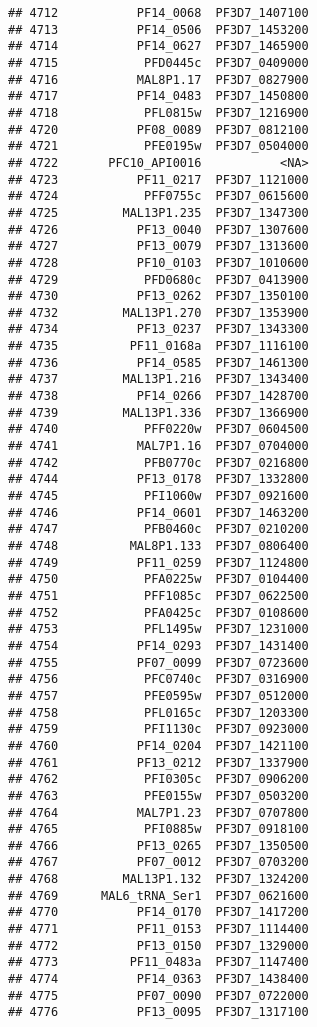 \documentclass{article}\usepackage[]{graphicx}\usepackage[]{color}
\makeatletter
\newenvironment{kframe}{%
 \def\at@end@of@kframe{}%
 \ifinner\ifhmode%
  \def\at@end@of@kframe{\end{minipage}}%
  \begin{minipage}{\columnwidth}%
 \fi\fi%
 \def\FrameCommand##1{\hskip\@totalleftmargin \hskip-\fboxsep
 \colorbox{shadecolor}{##1}\hskip-\fboxsep
     \hskip-\linewidth \hskip-\@totalleftmargin \hskip\columnwidth}%
 \MakeFramed {\advance\hsize-\width
   \@totalleftmargin\z@ \linewidth\hsize
   \@setminipage}}%
 {\par\unskip\endMakeFramed%
 \at@end@of@kframe}
\newenvironment{knitrout}{}{} %
\makeatother
\begin{document}
\begin{knitrout}
\begin{kframe}
\begin{verbatim}
## 4712           PF14_0068  PF3D7_1407100
## 4713           PF14_0506  PF3D7_1453200
## 4714           PF14_0627  PF3D7_1465900
## 4715            PFD0445c  PF3D7_0409000
## 4716           MAL8P1.17  PF3D7_0827900
## 4717           PF14_0483  PF3D7_1450800
## 4718            PFL0815w  PF3D7_1216900
## 4720           PF08_0089  PF3D7_0812100
## 4721            PFE0195w  PF3D7_0504000
## 4722       PFC10_API0016           <NA>
## 4723           PF11_0217  PF3D7_1121000
## 4724            PFF0755c  PF3D7_0615600
## 4725         MAL13P1.235  PF3D7_1347300
## 4726           PF13_0040  PF3D7_1307600
## 4727           PF13_0079  PF3D7_1313600
## 4728           PF10_0103  PF3D7_1010600
## 4729            PFD0680c  PF3D7_0413900
## 4730           PF13_0262  PF3D7_1350100
## 4732         MAL13P1.270  PF3D7_1353900
## 4734           PF13_0237  PF3D7_1343300
## 4735          PF11_0168a  PF3D7_1116100
## 4736           PF14_0585  PF3D7_1461300
## 4737         MAL13P1.216  PF3D7_1343400
## 4738           PF14_0266  PF3D7_1428700
## 4739         MAL13P1.336  PF3D7_1366900
## 4740            PFF0220w  PF3D7_0604500
## 4741           MAL7P1.16  PF3D7_0704000
## 4742            PFB0770c  PF3D7_0216800
## 4744           PF13_0178  PF3D7_1332800
## 4745            PFI1060w  PF3D7_0921600
## 4746           PF14_0601  PF3D7_1463200
## 4747            PFB0460c  PF3D7_0210200
## 4748          MAL8P1.133  PF3D7_0806400
## 4749           PF11_0259  PF3D7_1124800
## 4750            PFA0225w  PF3D7_0104400
## 4751            PFF1085c  PF3D7_0622500
## 4752            PFA0425c  PF3D7_0108600
## 4753            PFL1495w  PF3D7_1231000
## 4754           PF14_0293  PF3D7_1431400
## 4755           PF07_0099  PF3D7_0723600
## 4756            PFC0740c  PF3D7_0316900
## 4757            PFE0595w  PF3D7_0512000
## 4758            PFL0165c  PF3D7_1203300
## 4759            PFI1130c  PF3D7_0923000
## 4760           PF14_0204  PF3D7_1421100
## 4761           PF13_0212  PF3D7_1337900
## 4762            PFI0305c  PF3D7_0906200
## 4763            PFE0155w  PF3D7_0503200
## 4764           MAL7P1.23  PF3D7_0707800
## 4765            PFI0885w  PF3D7_0918100
## 4766           PF13_0265  PF3D7_1350500
## 4767           PF07_0012  PF3D7_0703200
## 4768         MAL13P1.132  PF3D7_1324200
## 4769      MAL6_tRNA_Ser1  PF3D7_0621600
## 4770           PF14_0170  PF3D7_1417200
## 4771           PF11_0153  PF3D7_1114400
## 4772           PF13_0150  PF3D7_1329000
## 4773          PF11_0483a  PF3D7_1147400
## 4774           PF14_0363  PF3D7_1438400
## 4775           PF07_0090  PF3D7_0722000
## 4776           PF13_0095  PF3D7_1317100

\end{verbatim}
\end{kframe}
\end{knitrout}
\end{document}

